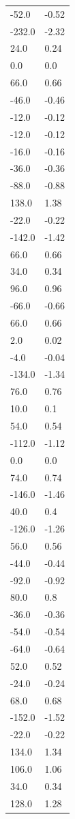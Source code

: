 \begin{longtable}{ll}
-52.0 & -0.52 \\
-232.0 & -2.32 \\
24.0 & 0.24 \\
0.0 & 0.0 \\
66.0 & 0.66 \\
-46.0 & -0.46 \\
-12.0 & -0.12 \\
-12.0 & -0.12 \\
-16.0 & -0.16 \\
-36.0 & -0.36 \\
-88.0 & -0.88 \\
138.0 & 1.38 \\
-22.0 & -0.22 \\
-142.0 & -1.42 \\
66.0 & 0.66 \\
34.0 & 0.34 \\
96.0 & 0.96 \\
-66.0 & -0.66 \\
66.0 & 0.66 \\
2.0 & 0.02 \\
-4.0 & -0.04 \\
-134.0 & -1.34 \\
76.0 & 0.76 \\
10.0 & 0.1 \\
54.0 & 0.54 \\
-112.0 & -1.12 \\
0.0 & 0.0 \\
74.0 & 0.74 \\
-146.0 & -1.46 \\
40.0 & 0.4 \\
-126.0 & -1.26 \\
56.0 & 0.56 \\
-44.0 & -0.44 \\
-92.0 & -0.92 \\
80.0 & 0.8 \\
-36.0 & -0.36 \\
-54.0 & -0.54 \\
-64.0 & -0.64 \\
52.0 & 0.52 \\
-24.0 & -0.24 \\
68.0 & 0.68 \\
-152.0 & -1.52 \\
-22.0 & -0.22 \\
134.0 & 1.34 \\
106.0 & 1.06 \\
34.0 & 0.34 \\
128.0 & 1.28 \\

\end{longtable}
